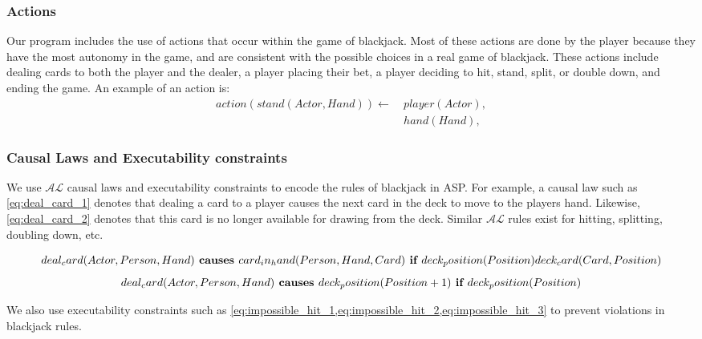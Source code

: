 \documentclass{article}
\begin{document}
\subsubsection{Actions}

Our program includes the use of actions that occur within the game of blackjack.
Most of these actions are done by the player because they have the most autonomy in the game,
and are consistent with the possible choices in a real game of blackjack.
These actions include dealing cards to both the player and the dealer, a player placing their bet,
a player deciding to hit, stand, split, or double down, and ending the game.
An example of an action is:
\begin{equation}
    \begin{split}
        action(stand(Actor, Hand)) \leftarrow \
            & player(Actor), \\
            & hand(Hand),
    \end{split}
\end{equation}

\subsubsection{Causal Laws and Executability constraints}

We use $\mathcal{AL}$ causal laws and executability constraints to encode the rules of blackjack in ASP.
For example, a causal law such as \cref{eq:deal_card_1} denotes that dealing a card to a player causes the next card in the deck to move to the players hand.
Likewise, \cref{eq:deal_card_2} denotes that this card is no longer available for drawing from the deck.
Similar $\mathcal{AL}$ rules exist for hitting, splitting, doubling down, etc.

\begin{equation}
    \label{eq:deal_card_1}
    deal_card(Actor, Person, Hand) \textbf{ causes } card_in_hand(Person, Hand, Card) \textbf{ if } \\
        deck_position(Position)
        deck_card(Card, Position)
\end{equation}
\begin{equation}
    \label{eq:deal_card_2}
    deal_card(Actor, Person, Hand) \textbf{ causes } deck_position(Position + 1) \textbf{ if } \\
        deck_position(Position)
\end{equation}

We also use executability constraints such as \cref{eq:impossible_hit_1,eq:impossible_hit_2,eq:impossible_hit_3} to prevent violations in blackjack rules.
\end{document}
